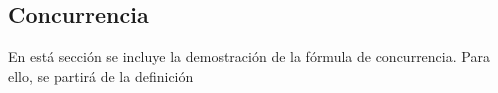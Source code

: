 \begin{appendixs}
\label{appendix5correlation}

\subsection{Concurrencia}
En está sección se incluye la demostración de la fórmula de concurrencia. Para ello, se partirá de la definición 



\label{appendix5final}

\end{appendixs}